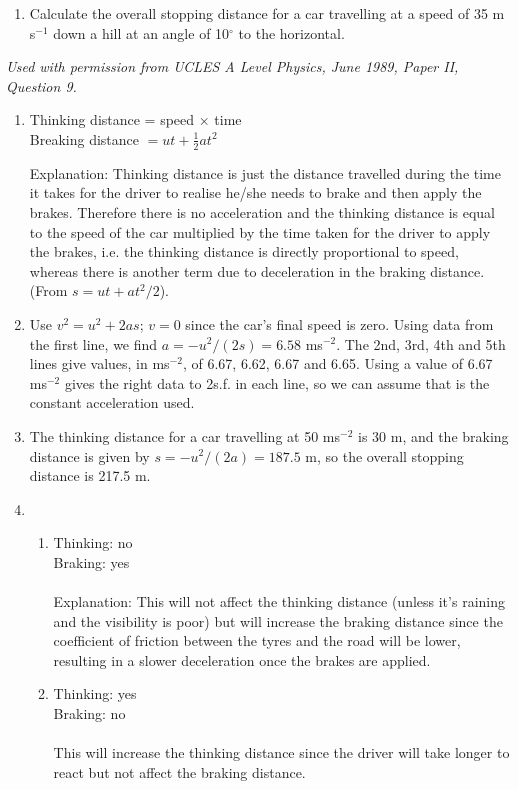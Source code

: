 \begin{problem}[A1989PIIQ9l]
{\begin{enumerate}
	\item Calculate the overall stopping distance for a car travelling at a speed of 35 m s$^{-1}$ down a hill at an angle of 10$^{\circ}$ to the horizontal.
  \end{enumerate}
}
{\textit{Used with permission from UCLES A Level Physics, June 1989, Paper II, Question 9.}}
{\begin{enumerate}
\item Thinking distance = speed $\times$ time \\
Breaking distance $= ut+\frac{1}{2}at^2$

Explanation:
Thinking distance is just the distance travelled during the time it takes for the driver to realise he/she needs to brake and then apply the brakes. Therefore there is no acceleration and the thinking distance is equal to the speed of the car multiplied by the time taken for the driver to apply the brakes, i.e. the thinking distance is directly proportional to speed, whereas there is another term due to deceleration in the braking distance. (From $s=ut+at^2/2$). 
\item Use $v^2=u^2+2as$; $v=0$ since the car's final speed is zero. Using data from the first line, we find $a=-u^2/(2s)=6.58$ ms$^{-2}$. The 2nd, 3rd, 4th and 5th lines give values, in ms$^{-2}$, of 6.67, 6.62, 6.67 and 6.65. Using a value of 6.67 ms$^{-2}$ gives the right data to 2s.f. in each line, so we can assume that is the constant acceleration used.  
\item The thinking distance for a car travelling at 50 ms$^{-2}$ is 30 m, and the braking distance is given by $s=-u^2/(2a)=187.5$ m, so the overall stopping distance is 217.5 m. 
\item 
\begin{enumerate}
\item Thinking: no \\ Braking: yes \\ \\
Explanation: This will not affect the thinking distance (unless it's raining and the visibility is poor) but will increase the braking distance since the coefficient of friction between the tyres and the road will be lower, resulting in a slower deceleration once the brakes are applied. 
\item Thinking: yes \\ Braking: no \\ \\
This will increase the thinking distance since the driver will take longer to react but not affect the braking distance.

\end{enumerate}
\end{enumerate}}
\end{problem}
